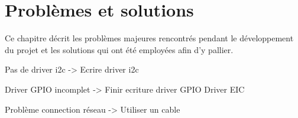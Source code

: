 
\chapter{Problèmes et solutions}\label{ch:prob_solutions}

Ce chapitre décrit les problèmes majeures rencontrés pendant le développement du projet et les solutions qui ont été employées afin d'y pallier.

Pas de driver i2c -> Ecrire driver i2c

Driver GPIO incomplet -> Finir ecriture driver GPIO
Driver EIC

Problème connection réseau -> Utiliser un cable
